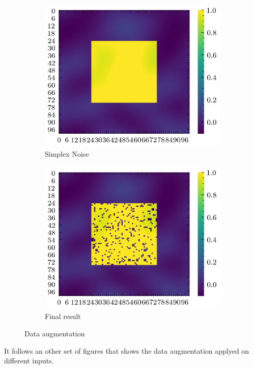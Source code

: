 \documentclass[../document.tex]{subfiles}
\begin{document}
\begin{figure}[H]
          \begin{subfigure}[b]{0.45\textwidth}
            \includegraphics[width=\textwidth]{../img/data-aug/2d/center-simplex.png}
            \caption{Simplex Noise}

        \end{subfigure}    
        \begin{subfigure}[b]{0.45\textwidth}
            \includegraphics[width=\textwidth]{../img/data-aug/2d/center-aug.png}
            \caption{Final result}
        \end{subfigure}    
    \label{fig: square-patch-aug}
    \caption{Data augmentation}    
\end{figure}
It follows an other set of figures that shows the data augmentation applyed on different inputs.
\end{document}
